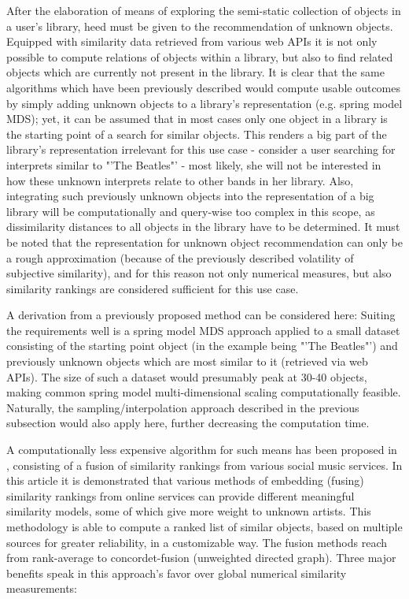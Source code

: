After the elaboration of means of exploring the semi-static collection of objects in a user's library, heed must be given to the recommendation of unknown objects. Equipped with similarity data retrieved from various web APIs it is not only possible to compute relations of objects within a library, but also to find related objects which are currently not present in the library. It is clear that the same algorithms which have been previously described would compute usable outcomes by simply adding unknown objects to a library's representation (e.g. spring model MDS); yet, it can be assumed that in most cases only one object in a library is the starting point of a search for similar objects. This renders a big part of the library's representation irrelevant for this use case - consider a user searching for interprets similar to "'The Beatles"' - most likely, she will not be interested in how these unknown interprets relate to other bands in her library. Also, integrating such previously unknown objects into the representation of a big library will be computationally and query-wise too complex in this scope, as dissimilarity distances to all objects in the library have to be determined. It must be noted that the representation for unknown object recommendation can only be a rough approximation (because of the previously described volatility of subjective similarity), and for this reason not only numerical measures, but also similarity rankings are considered sufficient for this use case.

A derivation from a previously proposed method can be considered here: Suiting the requirements well is a spring model MDS approach applied to a small dataset consisting of the starting point object (in the example being "'The Beatles"') and previously unknown objects which are most similar to it (retrieved via web APIs). The size of such a dataset would presumably peak at 30-40 objects, making common spring model multi-dimensional scaling computationally feasible. Naturally, the sampling/interpolation approach described in the previous subsection would also apply here, further decreasing the computation time.

A computationally less expensive algorithm for such means has been proposed in \cite{Marshall:2010}, consisting of a fusion of similarity rankings from various social music services. In this article it is demonstrated that various methods of embedding (fusing) similarity rankings from online services can provide different meaningful similarity models, some of which give more weight to unknown artists. This methodology is able to compute a ranked list of similar objects, based on multiple sources for greater reliability, in a customizable way. The fusion methods reach from rank-average to concordet-fusion (unweighted directed graph). Three major benefits speak in this approach's favor over global numerical similarity measurements:


